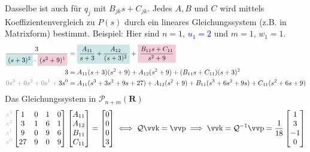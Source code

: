 Dasselbe ist auch f\"ur \(q_j\) mit \(B_{jk}s + C_{jk}\).
Jedes \(A, B\) und \(C\) wird mittels Koeffizientenvergleich zu \(P(s)\) durch
ein lineares Gleichungssystem (z.B. in Matrixform) bestimmt.
Beispiel: Hier sind
  \colorbox{teal!20}{\(n = 1\)},
  \textcolor{blue}{\(u_1 = 2\)} und
  \colorbox{purple!20}{\(m = 1\)},
  \textcolor{red!80!black}{\(w_1 = 1\)}.
\begin{align*}
  \frac{3}{
    \colorbox{teal!20}{\(
      (s + 3)^{\textcolor{blue}{2}}
    \)}
    \cdot
    \colorbox{purple!20}{\(
      (s^2 + 9)^{\textcolor{red}{1}}
    \)}
  }
  &=
  \colorbox{teal!20}{\(\displaystyle
    \frac{A_{11}}{s + 3} +
    \frac{A_{12}}{(s + 3)^2}
  \)}
  +
  \colorbox{purple!20}{\(\displaystyle
    \frac{B_{11} s + C_{11}}{s^2 + 9}
  \)}
  \\
  3 &= A_{11} (s + 3)(s^2 + 9) + A_{12} (s^2 + 9) + (B_{11} s + C_{11})(s + 3)^2 \\
  \begingroup\color{gray}0s^3 + 0s^2 + 0s^1 +\endgroup 3s^0 &=
    A_{11} (s^3 + 3s^2 + 9s + 27) +
    A_{12} (s^2 + 9) +
    B_{11} (s^3 + 6s^2 + 9s) +
    C_{11} (s^2 +6s + 9)
\end{align*}
Das Gleichungssystem in \(\mathcal{P}_{n+m}(\mathbf{R})\)
\[
  \begingroup\color{lightgray}
    \begin{matrix}
      s^3 \\ s^2 \\ s^1 \\ s^0
    \end{matrix}
  \endgroup
  \begin{bmatrix}
     1 & 0 & 1 & 0 \\
     3 & 1 & 6 & 1 \\
     9 & 0 & 9 & 6 \\
    27 & 9 & 0 & 9 
  \end{bmatrix}
  \begin{bmatrix}
    A_{11} \\ A_{12} \\ B_{11} \\ C_{11}
  \end{bmatrix} =
  \begin{bmatrix}
    0 \\ 0 \\ 0 \\ 3
  \end{bmatrix}
  \iff
  \mathcal{Q}\vec{k} = \vec{p}
  \implies
  \vec{k} = \mathcal{Q}^{-1} \vec{p} =
    \frac{1}{18}
    \begin{bmatrix}
      1 \\ 3 \\  -1 \\ 0
    \end{bmatrix}
\]
